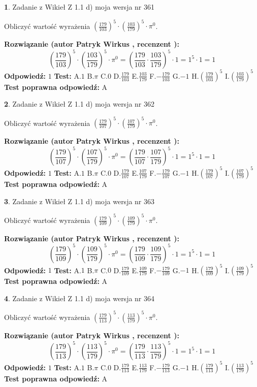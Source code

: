 \documentclass[12pt, a4paper]{article}
\theoremstyle{definition} %
\newtheorem{zad}{}
\newcommand{\zadStart}[1]{\begin{zad}#1\newline}
\newcommand{\zadStop}{\end{zad}}
\newcommand{\rozwStart}[2]{\noindent \textbf{Rozwiązanie (autor #1 , recenzent #2): }\newline}
\newcommand{\rozwStop}{\newline}
\newcommand{\odpStart}{\noindent \textbf{Odpowiedź:}\newline}
\newcommand{\odpStop}{\newline}
\newcommand{\testStart}{\noindent \textbf{Test:}\newline}
\newcommand{\testStop}{\newline}
\newcommand{\kluczStart}{\noindent \textbf{Test poprawna odpowiedź:}\newline}
\newcommand{\kluczStop}{\newline}
\begin{document}
\zadStart{Zadanie z Wikieł Z 1.1 d) moja wersja nr 361}

Obliczyć wartość wyrażenia $(\frac{179}{103})^{5} \cdot (\frac{103}{179})^{5} \cdot \pi^{0}$.
\zadStop
\rozwStart{Patryk Wirkus}{}
$$(\frac{179}{103})^{5} \cdot (\frac{103}{179})^{5} \cdot \pi^{0} = (\frac{179}{103} \cdot \frac{103}{179})^{5} \cdot 1 = 1^{5} \cdot 1 = 1$$
\rozwStop
\odpStart
$1$
\odpStop
\testStart
A.$1$ B.$\pi$ C.$0$ D.$\frac{179}{103}$ E.$\frac{103}{179}$
F.$-\frac{179}{103}$ G.$-1$
H.$(\frac{179}{103})^{5}$
I.$(\frac{103}{179})^{5}$
\testStop
\kluczStart
A
\kluczStop



\zadStart{Zadanie z Wikieł Z 1.1 d) moja wersja nr 362}

Obliczyć wartość wyrażenia $(\frac{179}{107})^{5} \cdot (\frac{107}{179})^{5} \cdot \pi^{0}$.
\zadStop
\rozwStart{Patryk Wirkus}{}
$$(\frac{179}{107})^{5} \cdot (\frac{107}{179})^{5} \cdot \pi^{0} = (\frac{179}{107} \cdot \frac{107}{179})^{5} \cdot 1 = 1^{5} \cdot 1 = 1$$
\rozwStop
\odpStart
$1$
\odpStop
\testStart
A.$1$ B.$\pi$ C.$0$ D.$\frac{179}{107}$ E.$\frac{107}{179}$
F.$-\frac{179}{107}$ G.$-1$
H.$(\frac{179}{107})^{5}$
I.$(\frac{107}{179})^{5}$
\testStop
\kluczStart
A
\kluczStop



\zadStart{Zadanie z Wikieł Z 1.1 d) moja wersja nr 363}

Obliczyć wartość wyrażenia $(\frac{179}{109})^{5} \cdot (\frac{109}{179})^{5} \cdot \pi^{0}$.
\zadStop
\rozwStart{Patryk Wirkus}{}
$$(\frac{179}{109})^{5} \cdot (\frac{109}{179})^{5} \cdot \pi^{0} = (\frac{179}{109} \cdot \frac{109}{179})^{5} \cdot 1 = 1^{5} \cdot 1 = 1$$
\rozwStop
\odpStart
$1$
\odpStop
\testStart
A.$1$ B.$\pi$ C.$0$ D.$\frac{179}{109}$ E.$\frac{109}{179}$
F.$-\frac{179}{109}$ G.$-1$
H.$(\frac{179}{109})^{5}$
I.$(\frac{109}{179})^{5}$
\testStop
\kluczStart
A
\kluczStop



\zadStart{Zadanie z Wikieł Z 1.1 d) moja wersja nr 364}

Obliczyć wartość wyrażenia $(\frac{179}{113})^{5} \cdot (\frac{113}{179})^{5} \cdot \pi^{0}$.
\zadStop
\rozwStart{Patryk Wirkus}{}
$$(\frac{179}{113})^{5} \cdot (\frac{113}{179})^{5} \cdot \pi^{0} = (\frac{179}{113} \cdot \frac{113}{179})^{5} \cdot 1 = 1^{5} \cdot 1 = 1$$
\rozwStop
\odpStart
$1$
\odpStop
\testStart
A.$1$ B.$\pi$ C.$0$ D.$\frac{179}{113}$ E.$\frac{113}{179}$
F.$-\frac{179}{113}$ G.$-1$
H.$(\frac{179}{113})^{5}$
I.$(\frac{113}{179})^{5}$
\testStop
\kluczStart
A
\kluczStop
\end{document}
